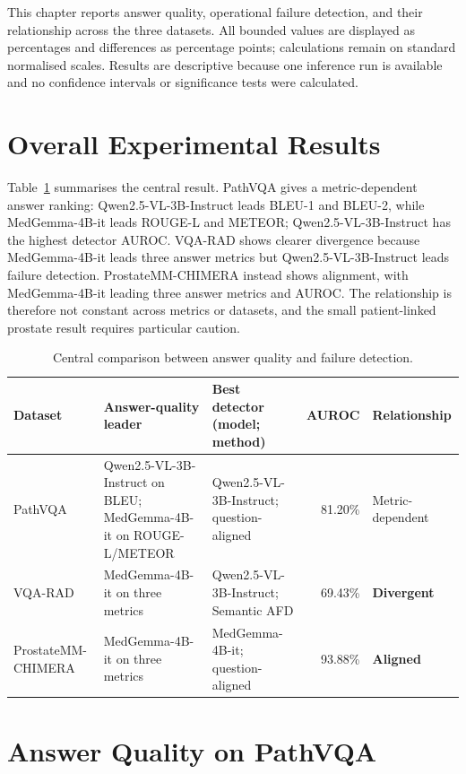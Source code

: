 This chapter reports answer quality, operational failure detection, and their relationship across the three datasets. All bounded values are displayed as percentages and differences as percentage points; calculations remain on standard normalised scales. Results are descriptive because one inference run is available and no confidence intervals or significance tests were calculated.

\section{Overall Experimental Results}

Table~\ref{tab:overall-result-pattern} summarises the central result. PathVQA gives a metric-dependent answer ranking: Qwen2.5-VL-3B-Instruct leads BLEU-1 and BLEU-2, while MedGemma-4B-it leads ROUGE-L and METEOR; Qwen2.5-VL-3B-Instruct has the highest detector AUROC. VQA-RAD shows clearer divergence because MedGemma-4B-it leads three answer metrics but Qwen2.5-VL-3B-Instruct leads failure detection. ProstateMM-CHIMERA instead shows alignment, with MedGemma-4B-it leading three answer metrics and AUROC. The relationship is therefore not constant across metrics or datasets, and the small patient-linked prostate result requires particular caution.

\begin{table}[htbp]
    \centering
    \caption{Central comparison between answer quality and failure detection.}
    \label{tab:overall-result-pattern}
    \small
    \begin{tabularx}{\textwidth}{lXXrl}
        \toprule
        Dataset & Answer-quality leader & Best detector (model; method) & AUROC & Relationship \\
        \midrule
        PathVQA & Qwen2.5-VL-3B-Instruct on BLEU; MedGemma-4B-it on ROUGE-L/METEOR & Qwen2.5-VL-3B-Instruct; question-aligned & 81.20\% & Metric-dependent \\
        VQA-RAD & MedGemma-4B-it on three metrics & Qwen2.5-VL-3B-Instruct; Semantic AFD & 69.43\% & \textbf{Divergent} \\
        ProstateMM-CHIMERA & MedGemma-4B-it on three metrics & MedGemma-4B-it; question-aligned & 93.88\% & \textbf{Aligned} \\
        \bottomrule
    \end{tabularx}
\end{table}

\section{Answer Quality on PathVQA}

